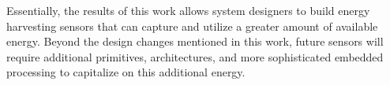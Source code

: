 Essentially, the results of this work allows system designers to build energy harvesting sensors that can capture and utilize a greater amount of available energy. 
Beyond the design changes mentioned in this work, future sensors will require additional primitives, architectures, and more sophisticated embedded processing to capitalize on this additional energy. 

%
%
%
%
%
%
%
